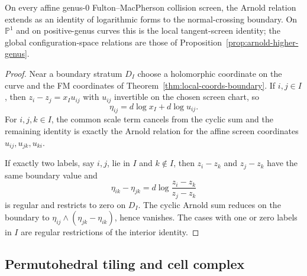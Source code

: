 \begin{lemma}\label{lem:arnold-boundary}
On every affine genus-$0$ Fulton--MacPherson collision screen, the
Arnold relation extends as an identity of logarithmic forms to the
normal-crossing boundary. On $\mathbb{P}^1$ and on positive-genus
curves this is the local tangent-screen identity; the global
configuration-space relations are those of
Proposition~\ref{prop:arnold-higher-genus}.
\end{lemma}

\begin{proof}
Near a boundary stratum $D_I$ choose a holomorphic coordinate on the
curve and the FM coordinates of
Theorem~\ref{thm:local-coords-boundary}. If $i,j\in I$, then
$z_i-z_j=x_Iu_{ij}$ with $u_{ij}$ invertible on the chosen screen chart,
so
\[
\eta_{ij}=d\log x_I+d\log u_{ij}.
\]
For $i,j,k\in I$, the common scale term cancels from the cyclic sum and
the remaining identity is exactly the Arnold relation for the affine
screen coordinates $u_{ij},u_{jk},u_{ki}$.

If exactly two labels, say $i,j$, lie in $I$ and $k\notin I$, then
$z_i-z_k$ and $z_j-z_k$ have the same boundary value and
\[
\eta_{ik}-\eta_{jk}
=d\log\frac{z_i-z_k}{z_j-z_k}
\]
is regular and restricts to zero on $D_I$. The cyclic Arnold sum reduces
on the boundary to
$\eta_{ij}\wedge(\eta_{jk}-\eta_{ik})$, hence vanishes. The cases with
one or zero labels in $I$ are regular restrictions of the interior
identity.
\end{proof}

\subsection{Permutohedral tiling and cell complex}

